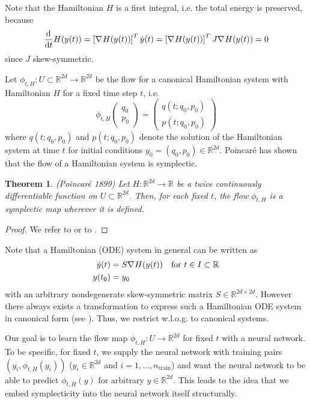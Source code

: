 \documentclass[twoside,a4paper]{article}
\newtheorem{theorem}{Theorem}
\begin{document}
Note that the Hamiltonian $H$ is a first integral, i.e. the total energy is preserved, because
\begin{equation*}
	\frac{\mathrm{d}^{}}{\mathrm{d}t} H(y(t)) = \left[ \nabla_{}{H}(y(t)) \right]^T \dot{y}(t) = 
	\left[ \nabla_{}{H}(y(t)) \right]^T J \nabla_{}{H}(y(t)) = 0
\end{equation*}
since $J$ skew-symmetric.

Let $\phi_{t,H} : U \subset \mathbb{R}^{2d} \to \mathbb{R}^{2d}$ be the flow for a 
canonical Hamiltonian system with Hamiltonian $H$ for a fixed time step $t$, i.e.
\begin{equation*}
	\phi_{t,H}\begin{pmatrix}
		q_0 \\
		p_0
	\end{pmatrix}
	= \begin{pmatrix}
		q(t; q_0, p_0) \\
		p(t; q_0, p_0)
	\end{pmatrix}
\end{equation*}
where $q(t; q_0, p_0)$ and $p(t; q_0, p_0)$ denote the solution of the Hamiltonian system
at time $t$ for initial conditions $y_0 = (q_0,p_0) \in \mathbb{R}^{2d}$. 
Poincaré has shown that the flow of a Hamiltonian system is symplectic.

\begin{theorem}(Poincaré 1899)
	Let $H: \mathbb{R}^{2d} \to \mathbb{R}$ be a twice continuously differentiable
	function on $U \subset \mathbb{R}^{2d}$. Then, for each fixed $t$, the flow
	$\phi_{t,H}$ is a symplectic map wherever it is defined.
\end{theorem}
\begin{proof}
	We refer to \citet[Theorem 2.4, p.~184]{hairer2006} 
	or to \citet[Theorem 1, p.~54]{leimkuhler_reich_2005}.
\end{proof}

Note that a Hamiltonian (ODE) system in general can be written as
\begin{align*}
	\dot{y}(t) &= S \nabla_{}{H}(y(t)) \quad \text{for } t \in I \subset \mathbb{R} \\
	y(t_0) &= y_0
\end{align*}
with an arbitrary nondegenerate skew-symmetric matrix $S \in \mathbb{R}^{2d \times 2d}$.
However there always exists a transformation to express such a Hamiltonian ODE system in
canonical form (see \citet[Remark 3.8]{peng2016}). Thus, we restrict w.l.o.g.
to canonical systems.

Our goal is to learn the flow map $\phi_{t,H} : U \to \mathbb{R}^{2d}$ for fixed $t$ with a neural network.
To be specific, for fixed $t$, we supply the neural network with training pairs $(y_i, \phi_{t,H}(y_i))$
($y_i \in \mathbb{R}^{2d}$ and $i=1, \dots, n_{\text{train}}$) and want the neural network
to be able to predict $\phi_{t,H}(y)$ for arbitrary $y \in \mathbb{R}^{2d}$.
This leads to the idea that we embed symplecticity into the neural network itself structurally.
\end{document}
